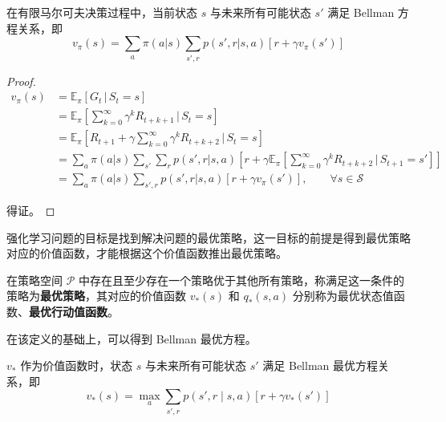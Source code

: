 \begin{definition}
    在有限马尔可夫决策过程中，当前状态 $s$ 与未来所有可能状态 $s'$ 满足 Bellman 方程关系，即
    \begin{equation}
        v_{\pi}(s) = \sum_a\pi(a|s)\sum_{s',r}p(s',r|s,a)\left[r+\gamma v_\pi(s') \right]
    \end{equation}
\end{definition}

\begin{proof}
    \[
    \begin{aligned} v_\pi(s) & = \mathbb{E}_\pi[G_t\,|\,S_t=s] \\ &=\mathbb{E}_\pi \left[\sum_{k=0}^\infty\gamma^kR_{t+k+1}\,|\,S_t=s \right] \\ &= \mathbb{E}_\pi \left [R_{t+1}+\gamma\sum_{k=0}^\infty\gamma^kR_{t+k+2}\,|\,S_t=s \right] \\ &=\sum_a\pi(a|s)\sum_{s'}\sum_rp(s',r|s,a)\left[r+\gamma \mathbb{E}_\pi \left[\sum_{k=0}^\infty\gamma^kR_{t+k+2}\,|\,S_{t+1}=s' \right] \right] \\ &= \sum_a\pi(a|s)\sum_{s',r}p(s',r|s,a)\left[r+\gamma v_\pi(s') \right], \qquad \forall s \in \mathcal S \end{aligned}
    \]

    得证。
\end{proof}

强化学习问题的目标是找到解决问题的最优策略，这一目标的前提是得到最优策略对应的价值函数，才能根据这个价值函数推出最优策略。

\begin{definition}
    在策略空间 $\mathcal{P}$ 中存在且至少存在一个策略优于其他所有策略，称满足这一条件的策略为\textbf{最优策略}，其对应的价值函数 $v_*(s)$ 和 $q_*(s,a)$ 分别称为{最优状态值函数}、\textbf{最优行动值函数}。
\end{definition}

在该定义的基础上，可以得到 Bellman 最优方程\cite{howard1960dynamic}。

\begin{definition}\label{the:optbellman}
    $v_*$ 作为价值函数时，状态 $s$ 与未来所有可能状态 $s'$ 满足 Bellman 最优方程关系，即
    \begin{equation}
        v_*(s)=\max_{a}\sum_{s',r}p(s',r \mid s,a)[r+\gamma v_*(s')]
    \end{equation}
\end{definition}

